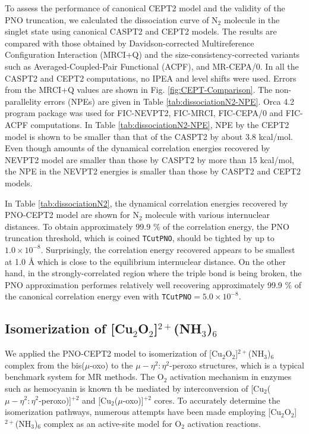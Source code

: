 \documentclass[aip,jcp,amsmath]{revtex4-1}
\begin{document}
%
To assess the performance of canonical CEPT2 model and the validity of the PNO truncation, we calculated the dissociation curve of N${}_2$ molecule in the singlet state using canonical CASPT2 and CEPT2 models.
%
The results are compared with those obtained by Davidson-corrected Multireference Configuration Interaction (MRCI+Q) and the size-consistency-corrected variants such as Averaged-Coupled-Pair Functional (ACPF), and MR-CEPA/0.
%
In all the CASPT2 and CEPT2 computations, no IPEA and level shifts were used.
%
Errors from the MRCI+Q values are shown in Fig. \ref{fig:CEPT-Comparison}.
%
The non-parallelity errors (NPEs) are given in Table \ref{tab:dissociationN2-NPE}.
%
Orca 4.2 program package\cite{WCMS:WCMS1327} was used for FIC-NEVPT2,\cite{angelin-electron2002} FIC-MRCI,\cite{doi:10.1063/1.4959029} FIC-CEPA/0 and FIC-ACPF\cite{Gdanitz1988} computations.
%
In Table \ref{tab:dissociationN2-NPE}, NPE by the CEPT2 model is shown to be smaller than that of the CASPT2 by about 3.8 kcal/mol.
%
Even though amounts of the dynamical correlation energies recovered by NEVPT2 model are smaller than those by CASPT2 by more than 15 kcal/mol, the NPE in the NEVPT2 energies is smaller than those by CASPT2 and CEPT2 models.

%
In Table \ref{tab:dissociationN2}, the dynamical correlation energies recovered by PNO-CEPT2 model are shown for N${}_2$ molecule with various internuclear distances.
%
To obtain approximately 99.9 $\%$ of the correlation energy, the PNO truncation threshold, which is coined {\tt TCutPNO}, should be tighted by up to $1.0\times 10^{-8}$.
%
Surprisingly, the correlation energy recovered appears to be smallest at 1.0 {\AA} which is close to the equilibrium internuclear distance.
%
On the other hand, in the strongly-correlated region where the triple bond is being broken, the PNO approximation performes relatively well recovering approximately 99.9 $\%$ of the canonical correlation energy even with {\tt TCutPNO}$=5.0\times 10^{-8}$.

\subsection{Isomerization of [Cu${}_2$O${}_2$]${}^{2+}$(NH${}_3$)${}_{6}$}

%
We applied the PNO-CEPT2 model to isomerization of [Cu${}_2$O${}_2$]${}^{2+}$(NH${}_3$)${}_{6}$ complex from the bis($\mu$-oxo) to the $\mu-\eta^2:\eta^2$-peroxo structures, which is a typical benchmark system for MR methods.\cite{Rode2005,AK74,doi:10.1063/1.4900878}
%
The O${}_2$ activation mechanism in enzymes such as hemocyanin is known th be mediated by interconversion of [Cu${}_2$($\mu-\eta^2:\eta^2$-peroxo)]${}^{+2}$ and [Cu${}_2$($\mu$-oxo)]${}^{+2}$ cores.
%
To accurately determine the isomerization pathways, numerous attempts have been made employing [Cu${}_2$O${}_2$]${}^{2+}$(NH${}_3$)${}_{6}$ complex as an active-site model for O${}_2$ activation reactions.
\end{document}
